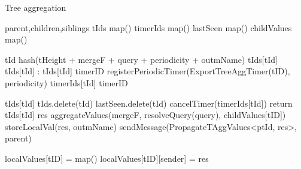 \begin{algorithm}
\caption{Tree aggregation} \label{alg:mon:tree_agg}
\begin{algorithmic}[1]

    \asdstate \label{alg:mon:tree_agg:state}
        \State parent,children,siblings 
        \State tIds \asdassign map()
        \State timerIds \asdassign map()
        \State lastSeen \asdassign map()
        \State childValues \asdassign map()
    \asdend

    \label{alg:mon:tree_agg:start_req}
        \State tId \asdassign hash(tHeight + mergeF + query + periodicity + outmName) \label{alg:mon:tree_agg:start_req_start}
            \State <tHeight, mergeF, query, periodicity, outmName, isLocal, isParentSub, ptId> \asdassign tIds[tId]
            \State tIds[tId] \asdassign <tHeight, mergeF, query, periodicity, outmName, true, isParentSub, ptId>
        \Else:
        \State tIds[tId] \asdassign <tHeight, mergeF, query, periodicity, outmName, true, false, nil>
        \State timerID \asdassign registerPeriodicTimer(ExportTreeAggTimer(tID), periodicity)
        \State timerIds[tId] \asdassign timerID
        \EndIf\label{alg:mon:tree_agg:start_req_end}
    \asdend

     \label{alg:mon:tree_agg:export_trigger}
        \State <tHeight, mergeF, query, periodicity, outmName, isLocal, isParentSub, ptId> \asdassign tIds[tId]
                \State tIds.delete(tId)
                \State lastSeen.delete(tId)
                \State cancelTimer(timerIds[tId])
                \State return
            \Else
                \State tIds[tId] \asdassign <tHeight, mergeF, query, periodicity, outmName, isLocal, false, nil>
            \EndIf
        \EndIf
        \State res \asdassign aggregateValues(mergeF, resolveQuery(query), childValues[tID])
            \State storeLocalVal(res, outmName)
        \EndIf 
            \State sendMessage(PropagateTAggValues<ptId, res>, parent)
        \EndIf
    \asdend

     \label{alg:mon:tree_agg:recv_propag_vals}
                \State localValues[tID] = map()
            \EndIf
            \State localValues[tID][sender] = res
        \EndIf
    \asdend


\end{algorithmic}
\end{algorithm}
